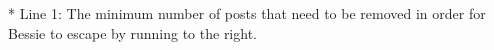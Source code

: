 * Line 1: The minimum number of posts that need to be removed in order         for Bessie to escape by running to the right.
